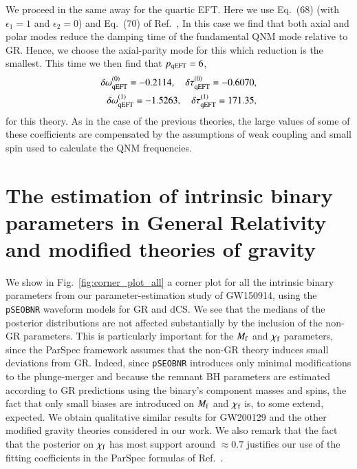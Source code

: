 \documentclass[twocolumn,
               prd,
               aps,
               superscriptaddress,
               tightenlines,
               nofootinbib,
               eqsecnum,
               amsfonts,
               amsmath,
               longbibliography]{revtex4-1}
\newcommand{\Mf}{M_{\rm f}}
\newcommand{\pSEOB}{\texttt{pSEOBNR}}
\newcommand{\hscomm}[1]{{\textcolor{TealBlue}{{[HS: #1]}}}}
\newcommand{\abcomm}[1]{{\textcolor{red}{{[AB: #1]}}}}
\begin{document}
We proceed in the same away for the quartic EFT. Here we use Eq.~(68) (with
$\epsilon_{1} = 1$ and $\epsilon_{2} = 0$) and Eq.~(70) of
Ref.~\cite{Cano:2021myl},
%
In this case we find that both axial and polar modes reduce the damping time
of the fundamental QNM mode relative to GR.
%
Hence, we choose the axial-parity mode for this which reduction is the smallest.
%
This time we then find that $p_{\rm qEFT} = 6$,
%
\begin{align}
    \delta \omega_{\rm qEFT}^{(0)} = -0.2114, \quad \delta \tau_{\rm qEFT}^{(0)} = -0.6070,
    \nonumber \\
    \delta \omega_{\rm qEFT}^{(1)} = -1.5263, \quad \delta \tau_{\rm qEFT}^{(1)} = 171.35,
\end{align}
%
for this theory.
%
As in the case of the previous theories, the large values of some of these
coefficients are compensated by the assumptions of weak coupling and small spin
used to calculate the QNM frequencies.

\section{The estimation of  intrinsic binary parameters in General Relativity and modified theories of gravity}
\label{app:big_contour}

We show in Fig.~\ref{fig:corner_plot_all} a corner plot for all the intrinsic
binary parameters from our parameter-estimation study of GW150914, using the
\pSEOB{} waveform models for GR and dCS.
%
We see that the medians of the posterior distributions are not affected substantially by the inclusion of the non-GR parameters.
%
This is particularly important for the $\Mf$ and $\chi_{\rm f}$ parameters, since
the ParSpec framework assumes that the non-GR theory induces small deviations from GR.
%
Indeed, since \pSEOB{} introduces only minimal modifications to the plunge-merger 
and because the remnant BH parameters are estimated according to GR
predictions using the binary's component masses and spins, the fact that only small 
biases are introduced on $\Mf$ and $\chi_{\rm f}$ is, to some extend, expected. 
%
We obtain qualitative similar results for GW200129 and the other modified gravity theories considered in our work.
%
We also remark that the fact that the posterior on $\chi_{\rm f}$ has most support around $\approx 0.7$ justifies our use
of the fitting coefficients in the ParSpec formulas of Ref.~\cite{Maselli:2019mjd}.
%
%
\end{document}
